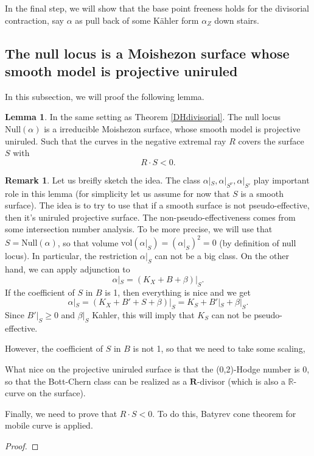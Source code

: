 \documentclass[11pt]{article}
\theoremstyle{definition}
\newtheorem{lemma}[theorem]{Lemma}
\newtheorem{remark}[theorem]{Remark}
\begin{document}
	In the final step, we will show that the base point freeness holds for the divisorial contraction, say $\alpha$ as pull back of some K\"ahler form $\alpha_Z$ down stairs. 
	
	\subsection{The null locus is a Moishezon surface whose smooth model is projective uniruled}
	In this subsection, we will proof the following lemma.
	\begin{lemma}
		In the same setting as Theorem \ref{DHdivisorial}. The null locus $\text{Null}(\alpha)$ is a irreducible Moishezon surface, whose smooth model is projective uniruled. Such that the curves in the negative extremal ray $R$ covers the surface $S$ with $$R \cdot S <0.$$
	\end{lemma}
	\begin{remark}
		Let us breifly sketch the idea. The class $\alpha|_S, \alpha|_{S^\nu}, \alpha|_{S'}$ play important role in this lemma (for simplicity let us assume for now that $S$ is a smooth surface). The idea is to try to use that if a smooth surface is not pseudo-effective, then it's uniruled projective surface. The non-pseudo-effectiveness comes from some intersection number analysis. To be more precise, we will use that $S = \text{Null}(\alpha)$, so that volume $\text{vol}(\alpha|_S)  = (\alpha|_S)^2= 0$ (by definition of null locus). In particular, the restriction $\alpha|_S$ can not be a big class. On the other hand, we can apply adjunction to $$\alpha|_S  = (K_X+B+\beta)|_S.$$
		If the coefficient of $S$ in $B$ is 1, then everything is nice and we get $$\alpha|_S = (K_X+B ' + S + \beta)|_S = K_S+ B'|_S + \beta|_S.$$Since $B'|_S\ge 0$ and $\beta|_S$ Kahler, this will imply that $K_S$ can not be pseudo-effective. 
		
		However, the coefficient of $S$ in $B$ is not 1, so that we need to take some scaling, 
		
		What nice on the projective uniruled surface is that the (0,2)-Hodge number is 0, so that the Bott-Chern class can be realized as a $\mathbf{R}$-divisor (which is also a $\mathbb{R}$-curve on the surface). 
		
		Finally, we need to prove that $R\cdot S<0$. To do this, Batyrev cone theorem for mobile curve is applied. 
	\end{remark}
	\begin{proof}
		
	\end{proof}
	
\end{document}

